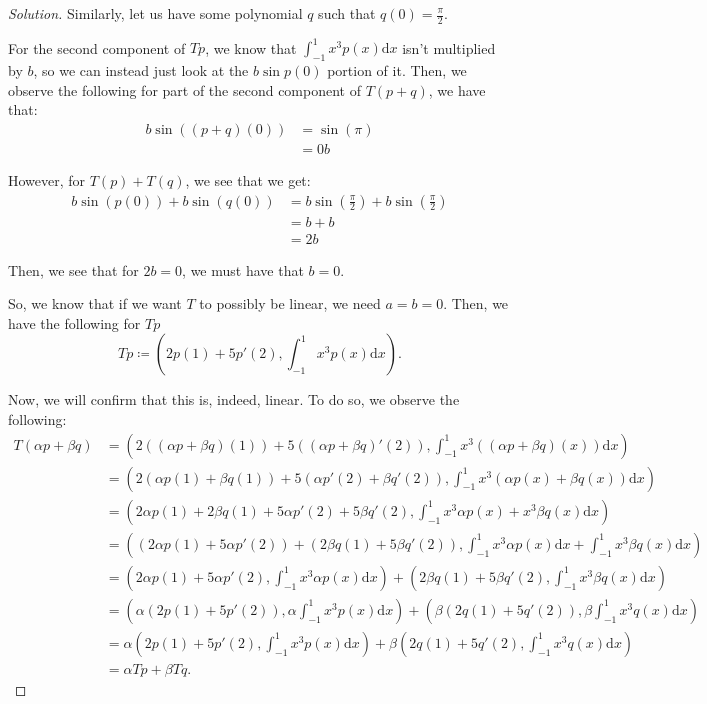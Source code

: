 \documentclass{article}
\newenvironment{solution}{\begin{proof}[Solution]}{\end{proof}}
\begin{document}
\begin{solution}
		Similarly, let us have some polynomial $q$ such that $q(0) = \frac{\pi}{2}$.
		
		For the second component of $Tp$, we know that $\int_{-1}^{1} x^{3}p(x) \mathrm dx$ isn't multiplied by $b$, so we can instead just look at the $b \sin p(0)$ portion of it. Then, we observe the following for part of the second component of $T(p+q)$, we have that:
		\begin{align*}
			b\sin ( (p+q)(0)) &= \sin(\pi) \\
			&= 0b
		\end{align*} 
	
		However, for $T(p) + T(q)$, we see that we get:
		\begin{align*}
			b\sin (p(0)) + b\sin (q(0)) &= b\sin(\frac{\pi}{2}) + b\sin(\frac{\pi}{2}) \\
			&= b + b\\ 
			&= 2b
		\end{align*}
	
		Then, we see that for $2b = 0$, we must have that $b = 0$.
		
		So, we know that if we want $T$ to possibly be linear, we need $a = b = 0$. Then, we have the following for $Tp$
		\begin{equation*}
			Tp \coloneq (2p(1) + 5p'(2), \int_{-1}^{1} x^{3}p(x)\mathrm d x).
		\end{equation*}
	
		Now, we will confirm that this is, indeed, linear. To do so, we observe the following:
		\begin{align*}
			T(\alpha p + \beta q) &= \left( 2((\alpha p+\beta q)(1)) + 5((\alpha p + \beta q)'(2)), \int_{-1}^{1} x^{3} ((\alpha p + \beta q)(x)) \mathrm dx \right) \\
			&= \left( 2(\alpha p(1) + \beta q(1)) + 5( \alpha p'(2) + \beta q'(2)), \int_{-1}^{1} x^{3} (\alpha p(x) + \beta q(x)) \mathrm dx \right) \\
			&= \left( 2\alpha p(1) + 2 \beta q(1) + 5\alpha p'(2) + 5\beta q'(2), \int_{-1}^{1} x^{3}\alpha p(x) + x^{3}\beta q(x) \mathrm dx \right) \\
			&= \left( \left( 2\alpha p(1) + 5\alpha p'(2) \right) + \left( 2\beta q(1) + 5\beta q'(2) \right), \int_{-1}^{1} x^{3}\alpha p(x) \mathrm dx + \int_{-1}^{1} x^{3}\beta q(x) \mathrm dx \right) \\
			&= \left( 2\alpha p(1) + 5\alpha p'(2), \int_{-1}^{1} x^{3}\alpha p(x) \mathrm dx \right) + \left( 2 \beta q(1) + 5 \beta q'(2), \int_{-1}^{1} x^{3}\beta q(x) \mathrm dx \right) \\
			&= \left( \alpha (2p(1) + 5p'(2)), \alpha \int_{-1}^{1} x^{3}p(x) \mathrm dx \right) + \left( \beta(2q(1) + 5q'(2)), \beta\int_{-1}^{1} x^{3}q(x) \mathrm dx \right) \\
			&= \alpha \left( 2p(1) + 5p'(2), \int_{-1}^{1} x^{3}p(x) \mathrm dx \right) + \beta\left( 2q(1) + 5q'(2), \int_{-1}^{1} x^{3}q(x) \mathrm dx  \right) \\
			&= \alpha Tp + \beta Tq.
		\end{align*}
	

\end{solution}
\end{document}
